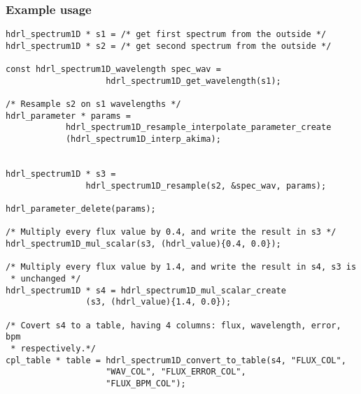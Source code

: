 \subsubsection{Example usage}
\begin{lstlisting}
hdrl_spectrum1D * s1 = /* get first spectrum from the outside */
hdrl_spectrum1D * s2 = /* get second spectrum from the outside */

const hdrl_spectrum1D_wavelength spec_wav =
                    hdrl_spectrum1D_get_wavelength(s1);

/* Resample s2 on s1 wavelengths */
hdrl_parameter * params =
            hdrl_spectrum1D_resample_interpolate_parameter_create
            (hdrl_spectrum1D_interp_akima);


hdrl_spectrum1D * s3 =
                hdrl_spectrum1D_resample(s2, &spec_wav, params);

hdrl_parameter_delete(params);

/* Multiply every flux value by 0.4, and write the result in s3 */
hdrl_spectrum1D_mul_scalar(s3, (hdrl_value){0.4, 0.0});

/* Multiply every flux value by 1.4, and write the result in s4, s3 is 
 * unchanged */
hdrl_spectrum1D * s4 = hdrl_spectrum1D_mul_scalar_create
				(s3, (hdrl_value){1.4, 0.0});

/* Covert s4 to a table, having 4 columns: flux, wavelength, error, bpm
 * respectively.*/
cpl_table * table = hdrl_spectrum1D_convert_to_table(s4, "FLUX_COL", 
					"WAV_COL", "FLUX_ERROR_COL", 
					"FLUX_BPM_COL");

\end{lstlisting}
